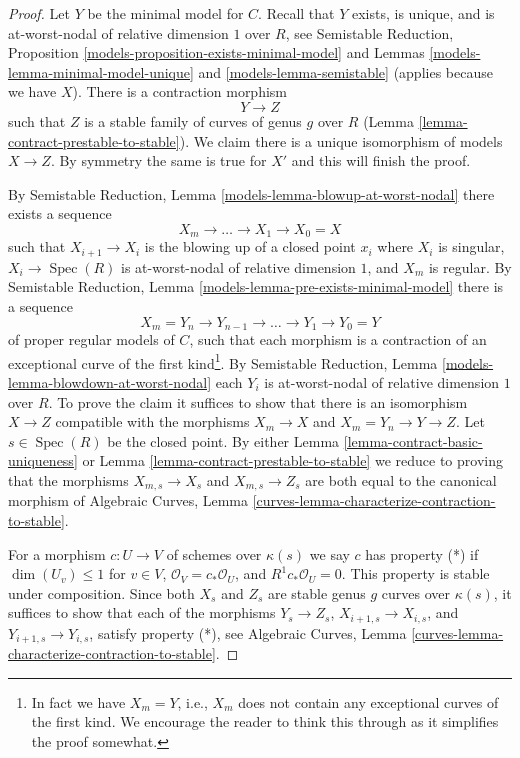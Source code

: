 \documentclass{stacks-project}
\theoremstyle{plain}
\theoremstyle{definition}
\theoremstyle{remark}
\numberwithin{equation}{subsection}
\def\Spec{\mathop{\mathrm{Spec}}}
\begin{document}
\begin{proof}
Let $Y$ be the minimal model for $C$. Recall that $Y$ exists, is
unique, and is at-worst-nodal of relative dimension $1$ over $R$, see
Semistable Reduction,
Proposition \ref{models-proposition-exists-minimal-model} and
Lemmas \ref{models-lemma-minimal-model-unique} and
\ref{models-lemma-semistable} (applies because we have $X$).
There is a contraction morphism
$$
Y \longrightarrow Z
$$
such that $Z$ is a stable family of curves of genus $g$ over $R$
(Lemma \ref{lemma-contract-prestable-to-stable}). We claim
there is a unique isomorphism of models $X \to Z$.
By symmetry the same is true for $X'$ and this will finish the proof.

\medskip\noindent
By Semistable Reduction, Lemma \ref{models-lemma-blowup-at-worst-nodal}
there exists a sequence
$$
X_m \to \ldots \to X_1 \to X_0 = X
$$
such that $X_{i + 1} \to X_i$ is the blowing up of a closed point
$x_i$ where $X_i$ is singular, $X_i \to \Spec(R)$ is at-worst-nodal
of relative dimension $1$, and $X_m$ is regular.
By Semistable Reduction, Lemma \ref{models-lemma-pre-exists-minimal-model}
there is a sequence
$$
X_m = Y_n \to Y_{n - 1} \to \ldots \to Y_1 \to Y_0 = Y
$$
of proper regular models of $C$, such that each morphism is a
contraction of an exceptional curve of the first kind\footnote{In fact
we have $X_m = Y$, i.e., $X_m$ does not contain any exceptional curves
of the first kind. We encourage the reader to think this through
as it simplifies the proof somewhat.}.
By Semistable Reduction, Lemma \ref{models-lemma-blowdown-at-worst-nodal}
each $Y_i$ is at-worst-nodal of relative dimension $1$ over $R$.
To prove the claim it suffices to show that there is an isomorphism
$X \to Z$ compatible with the morphisms $X_m \to X$
and $X_m = Y_n \to Y \to Z$. Let $s \in \Spec(R)$ be the closed point.
By either
Lemma \ref{lemma-contract-basic-uniqueness} or
Lemma \ref{lemma-contract-prestable-to-stable}
we reduce to proving that the morphisms
$X_{m, s} \to X_s$ and
$X_{m, s} \to Z_s$
are both equal to the canonical morphism of
Algebraic Curves, Lemma \ref{curves-lemma-characterize-contraction-to-stable}.

\medskip\noindent
For a morphism $c : U \to V$ of schemes over $\kappa(s)$
we say $c$ has property (*) if $\dim(U_v) \leq 1$ for $v \in V$,
$\mathcal{O}_V = c_*\mathcal{O}_U$, and $R^1c_*\mathcal{O}_U = 0$.
This property is stable under composition.
Since both $X_s$ and $Z_s$ are stable genus $g$ curves over $\kappa(s)$,
it suffices to show that each of the morphisms $Y_s \to Z_s$,
$X_{i + 1, s} \to X_{i, s}$, and $Y_{i + 1, s} \to Y_{i, s}$,
satisfy property (*), see
Algebraic Curves, Lemma \ref{curves-lemma-characterize-contraction-to-stable}.


\end{proof}
\end{document}
